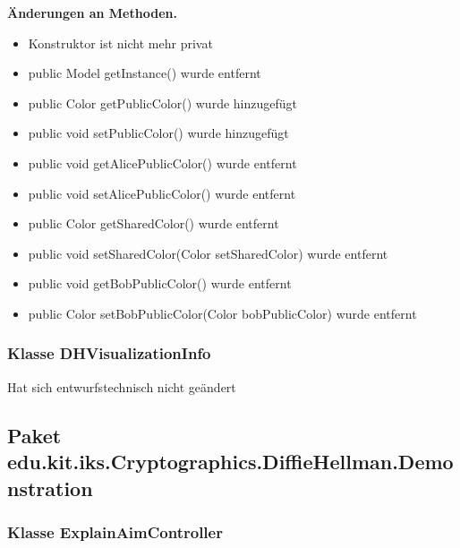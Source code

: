 \documentclass{article}
\begin{document}
    \textbf{Änderungen an Methoden.}\newline
	   \begin{itemize}
           \item Konstruktor ist nicht mehr privat\newline
           \item public Model getInstance() wurde entfernt\newline
           \item public Color getPublicColor() wurde hinzugefügt\newline
           \item public void setPublicColor() wurde hinzugefügt\newline
           \item public void getAlicePublicColor() wurde entfernt\newline
           \item public void setAlicePublicColor() wurde entfernt\newline
           \item public Color getSharedColor() wurde entfernt\newline
           \item public void setSharedColor(Color setSharedColor) wurde entfernt\newline
           \item public void getBobPublicColor() wurde entfernt\newline
           \item public Color setBobPublicColor(Color bobPublicColor) wurde entfernt\newline
           \end{itemize}

	\subsubsection{Klasse DHVisualizationInfo}
    Hat sich entwurfstechnisch nicht geändert\newline

  \subsection{Paket edu.kit.iks.Cryptographics.DiffieHellman.Demonstration}

	\subsubsection{Klasse ExplainAimController}
\end{document}
